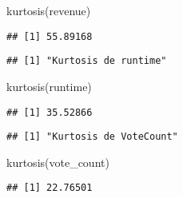 \documentclass[
]{article}
\newenvironment{Shaded}{\begin{snugshade}}{\end{snugshade}}
\newcommand{\CommentTok}[1]{\textcolor[rgb]{0.56,0.35,0.01}{\textit{#1}}}
\newcommand{\FunctionTok}[1]{\textcolor[rgb]{0.00,0.00,0.00}{#1}}
\newcommand{\NormalTok}[1]{#1}
\newcommand{\OtherTok}[1]{\textcolor[rgb]{0.56,0.35,0.01}{#1}}
\newcommand{\SpecialCharTok}[1]{\textcolor[rgb]{0.00,0.00,0.00}{#1}}
\newcommand{\StringTok}[1]{\textcolor[rgb]{0.31,0.60,0.02}{#1}}
\begin{document}
\begin{Shaded}
\begin{Highlighting}[]
\FunctionTok{kurtosis}\NormalTok{(revenue)}
\end{Highlighting}
\end{Shaded}

\begin{verbatim}
## [1] 55.89168
\end{verbatim}

\begin{Shaded}
\end{Shaded}

\begin{verbatim}
## [1] "Kurtosis de runtime"
\end{verbatim}

\begin{Shaded}
\begin{Highlighting}[]
\FunctionTok{kurtosis}\NormalTok{(runtime)}
\end{Highlighting}
\end{Shaded}

\begin{verbatim}
## [1] 35.52866
\end{verbatim}

\begin{Shaded}
\end{Shaded}

\begin{verbatim}
## [1] "Kurtosis de VoteCount"
\end{verbatim}

\begin{Shaded}
\begin{Highlighting}[]
\FunctionTok{kurtosis}\NormalTok{(vote\_count)}
\end{Highlighting}
\end{Shaded}

\begin{verbatim}
## [1] 22.76501
\end{verbatim}
\end{document}
